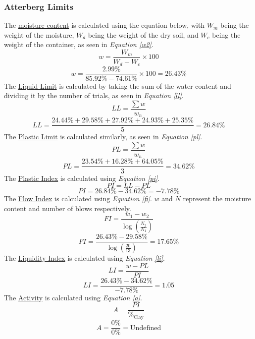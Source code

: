 \documentclass{article}
\begin{document}
\subsubsection{Atterberg Limits}
\noindent The \underline{moisture content} is calculated using the equation below, with $W_m$ being the weight of the moisture, $W_d$ being the weight of the dry soil, and $W_c$ being the weight of the container, as seen in \emph{Equation \ref{w2}}. 
\begin{equation}\label{w2} w=\frac{W_m}{W_d-W_c}\times 100 \end{equation}
\[w=\frac{2.99\%}{85.92\%-74.61\%}\times 100 = \boxed{26.43\%}\]
\noindent The \underline{Liquid Limit} is calculated by taking the sum of the water content and dividing it by the number of trials, as seen in \emph{Equation \ref{ll}}.
\begin{equation}\label{ll} LL=\frac{\sum w}{w_n} \end{equation}
\[LL=\frac{24.44\%+29.58\%+27.92\%+24.93\%+25.35\%}{5}=\boxed{26.84\%}\]
\noindent The \underline{Plastic Limit} is calculated similarly, as seen in \emph{Equation \ref{pl}}.
\begin{equation}\label{pl} PL=\frac{\sum w}{w_n} \end{equation}
\[PL=\frac{23.54\%+16.28\%+64.05\%}{3}=\boxed{34.62\%}\]
\noindent The \underline{Plastic Index} is calculated using \emph{Equation \ref{pi}}. 
\begin{equation}\label{pi}PI=LL-PL\end{equation} 
\[PI=26.84\%-34.62\%=\boxed{-7.78\%}\]
\noindent The \underline{Flow Index} is calculated using \emph{Equation \ref{fi}}. $w$ and $N$ represent the moisture content and number of blows respectively. 
\begin{equation}\label{fi}FI=\frac{w_1-w_2}{\log\left(\frac{N_2}{N_1}\right)}\end{equation}  
\[FI=\frac{26.43\%-29.58\%}{\log\left(\frac{20}{13}\right)}=\boxed{17.65\%}\]
\noindent The \underline{Liquidity Index} is calculated using \emph{Equation \ref{li}}. 
\begin{equation}\label{li}LI=\frac{w-PL}{PI}\end{equation} 
\[LI=\frac{26.43\%-34.62\%}{-7.78\%}=\boxed{1.05}\]
\noindent The \underline{Activity} is calculated using \emph{Equation \ref{a}}.
\begin{equation}\label{a}A=\frac{PI}{\%_\text{Clay}}\end{equation} 
\[A=\frac{0\%}{0\%}=\boxed{\text{Undefined}}\]
\end{document}
